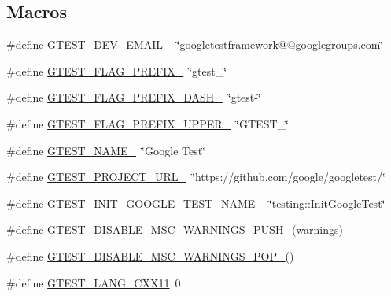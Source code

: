 \subsection*{Macros}
\begin{DoxyCompactItemize}
\item 
\#define \mbox{\hyperlink{gtest-port_8h_a21086d276b1a64d6763ee8a94b12c1b8}{G\+T\+E\+S\+T\+\_\+\+D\+E\+V\+\_\+\+E\+M\+A\+I\+L\+\_\+}}~\char`\"{}googletestframework@@googlegroups.\+com\char`\"{}
\item 
\#define \mbox{\hyperlink{gtest-port_8h_a088e84784c589ba9b1fc48602ad8eabf}{G\+T\+E\+S\+T\+\_\+\+F\+L\+A\+G\+\_\+\+P\+R\+E\+F\+I\+X\+\_\+}}~\char`\"{}gtest\+\_\+\char`\"{}
\item 
\#define \mbox{\hyperlink{gtest-port_8h_a4251ff898f9f94ec6b8b9402c3436759}{G\+T\+E\+S\+T\+\_\+\+F\+L\+A\+G\+\_\+\+P\+R\+E\+F\+I\+X\+\_\+\+D\+A\+S\+H\+\_\+}}~\char`\"{}gtest-\/\char`\"{}
\item 
\#define \mbox{\hyperlink{gtest-port_8h_a4018b7f288f974d022df397e2730633a}{G\+T\+E\+S\+T\+\_\+\+F\+L\+A\+G\+\_\+\+P\+R\+E\+F\+I\+X\+\_\+\+U\+P\+P\+E\+R\+\_\+}}~\char`\"{}G\+T\+E\+S\+T\+\_\+\char`\"{}
\item 
\#define \mbox{\hyperlink{gtest-port_8h_a13d98c217176bd8722c395b9225fc19d}{G\+T\+E\+S\+T\+\_\+\+N\+A\+M\+E\+\_\+}}~\char`\"{}Google Test\char`\"{}
\item 
\#define \mbox{\hyperlink{gtest-port_8h_a5aa3c938fc1d049f1d9c5332f6a0b1d4}{G\+T\+E\+S\+T\+\_\+\+P\+R\+O\+J\+E\+C\+T\+\_\+\+U\+R\+L\+\_\+}}~\char`\"{}https\+://github.\+com/google/googletest/\char`\"{}
\item 
\#define \mbox{\hyperlink{gtest-port_8h_aa5e27ad4f88278501ef71bd9ddbb44c6}{G\+T\+E\+S\+T\+\_\+\+I\+N\+I\+T\+\_\+\+G\+O\+O\+G\+L\+E\+\_\+\+T\+E\+S\+T\+\_\+\+N\+A\+M\+E\+\_\+}}~\char`\"{}testing\+::\+Init\+Google\+Test\char`\"{}
\item 
\#define \mbox{\hyperlink{gtest-port_8h_a86994cc68e844d8b82089c70408dfc61}{G\+T\+E\+S\+T\+\_\+\+D\+I\+S\+A\+B\+L\+E\+\_\+\+M\+S\+C\+\_\+\+W\+A\+R\+N\+I\+N\+G\+S\+\_\+\+P\+U\+S\+H\+\_\+}}(warnings)
\item 
\#define \mbox{\hyperlink{gtest-port_8h_ab4c44546d6d9aced68993b87b608fc06}{G\+T\+E\+S\+T\+\_\+\+D\+I\+S\+A\+B\+L\+E\+\_\+\+M\+S\+C\+\_\+\+W\+A\+R\+N\+I\+N\+G\+S\+\_\+\+P\+O\+P\+\_\+}}()
\item 
\#define \mbox{\hyperlink{gtest-port_8h_a6e310924e9ce4a9f8fda1b189cc680c4}{G\+T\+E\+S\+T\+\_\+\+L\+A\+N\+G\+\_\+\+C\+X\+X11}}~0
\item 

\end{DoxyCompactItemize}
